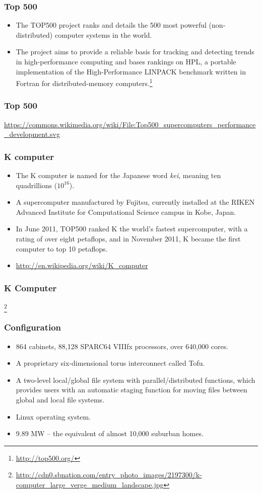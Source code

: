 \documentclass{beamer}
\begin{document}
\begin{CJK}{UTF8}{bsmi}
\begin{frame}
\frametitle{Top 500}
\begin{itemize}
\item The TOP500 project ranks and details the 500 most powerful
  (non-distributed) computer systems in the world.
\item The project aims to provide a reliable basis for tracking and
  detecting trends in high-performance computing and bases rankings on
  HPL, a portable implementation of the High-Performance LINPACK
  benchmark written in Fortran for distributed-memory computers.\footnote{\url{http://top500.org/}}
\end{itemize}
\end{frame}

\begin{frame}
\frametitle{Top 500}
\centerline{}
\url{https://commons.wikimedia.org/wiki/File:Top500_supercomputers_performance_development.svg}
\end{frame}

\begin{frame}
\frametitle{K computer}
\begin{itemize}
\item The K computer is named for the Japanese word {\em kei},
  meaning ten quadrillions ($10^{16}$).
\item A supercomputer manufactured by Fujitsu, currently installed at
  the RIKEN Advanced Institute for Computational Science campus in
  Kobe, Japan.
\item In June 2011, TOP500 ranked K the world's fastest supercomputer,
  with a rating of over eight petaflops, and in November 2011, K became
  the first computer to top 10 petaflops.
\item {\url{http://en.wikipedia.org/wiki/K_computer}}
\end{itemize}
\end{frame}

\begin{frame}
\frametitle{K Computer}
\centerline{}
\footnote{\url{http://cdn0.sbnation.com/entry_photo_images/2197300/k-computer_large_verge_medium_landscape.jpg}}
\end{frame}

\begin{frame}
\frametitle{Configuration}
\begin{itemize}
\item 864 cabinets, 88,128 SPARC64 VIIIfx processors, over 640,000 cores.
\item A proprietary six-dimensional torus interconnect called Tofu.
\item A two-level local/global file system with parallel/distributed
  functions, which provides users with an automatic staging function for
  moving files between global and local file systems.
\item Linux operating system.
\item 9.89 MW -- the equivalent of almost 10,000 suburban homes.
\end{itemize}
\end{frame}


\end{CJK}
\end{document}
